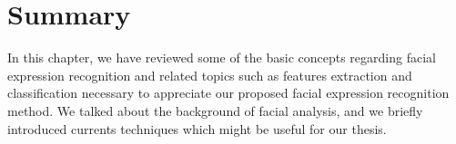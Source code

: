 %
%
%
%
%
%
%
%
%
%



\section{Summary}
\label{sec:ch1_Summary}

In this chapter, we have reviewed some of the basic concepts regarding facial expression recognition and related topics such as 
features extraction and classification necessary to appreciate our proposed facial expression recognition method.
We talked about the background of facial analysis, and we briefly introduced currents techniques which might be useful for our thesis. 